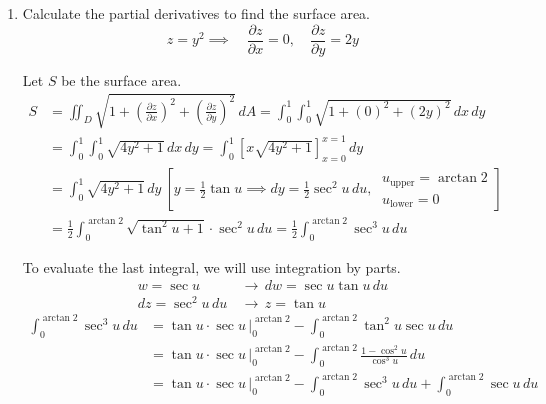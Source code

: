\documentclass[a4paper, 12pt]{article}
\begin{document}
\begin{enumerate}[leftmargin=*,label=\textbf{\arabic*.}]
\begin{enumerate}[leftmargin=*,label=\textbf{\alph*.}]
\begin{center}
\end{center}

\item Calculate the partial derivatives to find the surface area.
\[z=y^2\implies\quad\frac{\partial z}{\partial x}=0,\quad \frac{\partial z}{\partial y}=2y\]

Let $S$ be the surface area.
\begin{align*}S&=\iint_D\sqrt{1+\left(\frac{\partial z}{\partial x}\right)^2+\left(\frac{\partial z}{\partial y}\right)^2}\,dA=\int_0^1\int_0^1\sqrt{1+\left(0\right)^2+\left(2y\right)^2}\,dx\,dy\\[1em]&=\int_0^1\int_0^1\sqrt{4y^2+1}\,dx\,dy=\int_0^1\left[x\sqrt{4y^2+1}\right]_{x=0}^{x=1}\,dy\\[1em]&=\int_0^1\sqrt{4y^2+1}\,dy\:\left[y=\frac12\tan u \implies dy=\frac12\sec^2u\,du,\:\begin{array}{l}u_{\text{upper}}=\arctan2\\u_{\text{lower}}=0\end{array}\right]\\[1em]&=\frac12\int_0^{\arctan2}\sqrt{\tan^2u+1}\cdot\sec^2u\,du=\frac12\int_0^{\arctan2}\sec^3u\,du\end{align*}

To evaluate the last integral, we will use integration by parts.
\begin{align*}
    w=\sec u\,&\rightarrow\, dw = \sec u\tan u \,du\\
    dz=\sec^2u\,du\,&\rightarrow\, z = \tan u
\end{align*}
\begin{align*}
\int_0^{\arctan2}\sec^3u\,du&=\tan u \cdot \sec u\,\bigg|_0^{\arctan2} -\int_0^{\arctan2} \tan^2 u\sec u\, du\\[1em]&= \tan u \cdot \sec u\,\bigg|_0^{\arctan2} -\int_0^{\arctan2} \frac{1-\cos^2u}{\cos^3 u}\, du\\[1em]&= \tan u \cdot \sec u\,\bigg|_0^{\arctan2} - \int_0^{\arctan2} \sec^3u \, du + \int_0^{\arctan2} \sec u \, du 
\end{align*}


\end{enumerate}
\end{enumerate}
\end{document}
